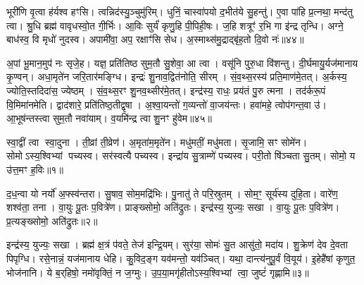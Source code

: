 भूरी॑णि वृ॒त्वा ह॑र्यश्व हꣳसि।
त्वन्निद॑स्यु॒ञ्चुमु॑रिम्।
धुनिं॒ चास्वा॑पयो द॒भीत॑ये सु॒हन्तु॑।
ए॒वा पा॑हि प्र॒त्नथा॒ मन्द॑तु त्वा।
श्रु॒धि ब्रह्म॑ वावृधस्वो॒त गी॒र्भिः।
आ॒विः सुर्यं॑ कृणु॒हि पी॒पिही॒षः।
ज॒हि शत्रूꣳ॑ र॒भि गा इ॑न्द्र तृन्धि।
अग्ने॒ बाध॑स्व॒ वि मृधो॑ नुदस्व।
अपामी॑वा॒ अप॒ रक्षाꣳ॑सि सेध।
अ॒स्माथ्स॑मु॒द्राद्बृ॑ह॒तो दि॒वो नः॑॥४४॥

अ॒पां भू॒मान॒मुप॑ नः सृजे॒ह।
यज्ञ॒ प्रति॑तिष्ठ सुम॒तौ सु॒शेवा॒ आ त्वा।
वसू॑नि पुरु॒धा वि॑शन्तु।
दी॒र्घमायु॒र्यज॑मानाय कृ॒ण्वन्।
अधा॒मृते॑न जरि॒तार॑मङ्ग्धि।
इन्द्रः॑ शु॒नाव॒द्वित॑नोति॒ सीरम्।
सं॒व॒थ्स॒रस्य॑ प्रति॒माण॑मे॒तत्।
अ॒र्कस्य॒ ज्योति॒स्तदिदा॑स॒ ज्येष्ठम्।
सं॒व॒थ्स॒रꣳ शु॒नव॒थ्सीर॑मे॒तत्।
इन्द्र॑स्य॒ राधः॒ प्रय॑तं पु॒रु त्मना।
तद॑र्करू॒पं वि॒मिमा॑नमेति।
द्वाद॑शारे॒ प्रति॑तिष्ठ॒तीद्वृषा।
अ॒श्वा॒यन्तो॑ ग॒व्यन्तो॑ वा॒जय॑न्तः।
हवा॑महे॒ त्वोप॑गन्त॒वा उ॑।
आ॒भूष॑न्तस्त्वा सुम॒तौ नवा॑याम्।
व॒यमि॑न्द्र त्वा शु॒नꣳ हु॑वेम॥४५॥




\clearpage
{}
\setcounter{anuvakam}{0}

स्वा॒द्वीं त्वा स्वा॒दुना।
ती॒व्रां ती॒व्रेण॑।
अ॒मृता॑म॒मृते॑न।
मधु॑मतीं॒ मधु॑मता।
सृ॒जामि॒ सꣳ सोमे॑न।
सोमो\-ऽस्य॒श्विभ्यां पच्यस्व।
सर॑स्वत्यै पच्यस्व।
इन्द्रा॑य सु॒त्राम्णे॑ पच्यस्व।
परी॒तो षि॑ञ्चता सु॒तम्।
सोमो॒ य उ॑त्त॒मꣳ ह॒विः॥१॥

द॒ध॒न्वा यो नर्यो॑ अ॒फ्स्व॑न्तरा।
सु॒षाव॒ सोम॒मद्रि॑भिः।
पु॒नातु॑ ते परि॒स्रुतम्।
सोम॒ꣳ॒ सूर्य॑स्य दुहि॒ता।
वारे॑ण॒ शश्व॑ता॒ तना।
वा॒युः पू॒तः प॒वित्रे॑ण।
प्राङ्ख्सोमो॒ अति॑द्रुतः।
इन्द्र॑स्य॒ युज्यः॒ सखा।
वा॒युः पू॒तः प॒वित्रे॑ण।
प्र॒त्यङ्ख्सोमो॒ अति॑द्रुतः॥२॥

इन्द्र॑स्य॒ युज्यः॒ सखा।
ब्रह्म॑ क्ष॒त्रं प॑वते॒ तेज॑ इन्द्रि॒यम्।
सुर॑या॒ सोमः॑ सु॒त आसु॑तो॒ मदा॑य।
शु॒क्रेण॑ देव दे॒वता पिपृग्धि।
रसे॒नान्नं॒ यज॑मानाय धेहि।
कु॒विद॒ङ्ग यव॑मन्तो॒ यव॑ञ्चित्।
यथा॒ दान्त्य॑नुपू॒र्वं वि॒यूय॑।
इ॒हेहै॑षां कृणुत॒ भोज॑नानि।
ये ब॒र्‌\mbox{}हिषो॒ नमो॑वृक्तिं॒ न ज॒ग्मुः।
उ॒प॒या॒मगृ॑हीतो\-ऽस्य॒श्विभ्यां त्वा॒ जुष्टं॑ गृह्णामि॥३॥

